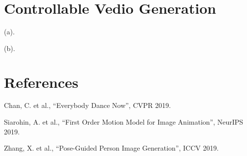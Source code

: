 \documentclass{article}
\begin{document}
\section{Controllable Vedio Generation}

(a). 

(b). 

\newpage

\section*{References}
\begin{enumerate}[label={[\arabic*]}]
    \item Chan, C. et al., ``Everybody Dance Now'', CVPR 2019.
    \item Siarohin, A. et al., ``First Order Motion Model for Image Animation'', NeurIPS 2019.
    \item Zhang, X. et al., ``Pose-Guided Person Image Generation'', ICCV 2019.
\end{enumerate}
\end{document}
